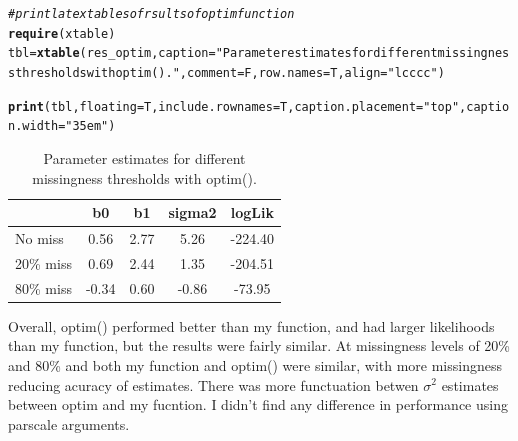 \documentclass{article}\usepackage[]{graphicx}\usepackage[]{color}
\makeatletter
\newcommand{\hlstr}[1]{\textcolor[rgb]{0.192,0.494,0.8}{#1}}%
\newcommand{\hlcom}[1]{\textcolor[rgb]{0.678,0.584,0.686}{\textit{#1}}}%
\newcommand{\hlstd}[1]{\textcolor[rgb]{0.345,0.345,0.345}{#1}}%
\newcommand{\hlkwb}[1]{\textcolor[rgb]{0.69,0.353,0.396}{#1}}%
\newcommand{\hlkwc}[1]{\textcolor[rgb]{0.333,0.667,0.333}{#1}}%
\newcommand{\hlkwd}[1]{\textcolor[rgb]{0.737,0.353,0.396}{\textbf{#1}}}%
\newenvironment{kframe}{%
 \def\at@end@of@kframe{}%
 \ifinner\ifhmode%
  \def\at@end@of@kframe{\end{minipage}}%
  \begin{minipage}{\columnwidth}%
 \fi\fi%
 \def\FrameCommand##1{\hskip\@totalleftmargin \hskip-\fboxsep
 \colorbox{shadecolor}{##1}\hskip-\fboxsep
     \hskip-\linewidth \hskip-\@totalleftmargin \hskip\columnwidth}%
 \MakeFramed {\advance\hsize-\width
   \@totalleftmargin\z@ \linewidth\hsize
   \@setminipage}}%
 {\par\unskip\endMakeFramed%
 \at@end@of@kframe}
\makeatother
\begin{document}
\begin{kframe}
\begin{alltt}
\hlcom{#print latex tables of rsults of optim function}
\hlkwd{require}\hlstd{(xtable)}
\hlstd{tbl}\hlkwb{=}\hlkwd{xtable}\hlstd{(res_optim,}\hlkwc{caption}\hlstd{=}\hlstr{"Parameter estimates for different missingness thresholds with optim()."}\hlstd{,}\hlkwc{comment}\hlstd{=F,}\hlkwc{row.names}\hlstd{=T,}\hlkwc{align}\hlstd{=}\hlstr{"lcccc"}\hlstd{)}

\hlkwd{print}\hlstd{(tbl,}\hlkwc{floating}\hlstd{=T,}\hlkwc{include.rownames}\hlstd{=T,}\hlkwc{caption.placement}\hlstd{=}\hlstr{"top"}\hlstd{,}\hlkwc{caption.width}\hlstd{=}\hlstr{"35em"}\hlstd{)}
\end{alltt}
\end{kframe}%
\begin{table}[ht]
\centering
\parbox{35em}{\caption{Parameter estimates for different missingness thresholds with optim().}} 
\begin{tabular}{lcccc}
  \hline
 & b0 & b1 & sigma2 & logLik \\ 
  \hline
No miss & 0.56 & 2.77 & 5.26 & -224.40 \\ 
  20\% miss & 0.69 & 2.44 & 1.35 & -204.51 \\ 
  80\% miss & -0.34 & 0.60 & -0.86 & -73.95 \\ 
   \hline
\end{tabular}
\end{table}



Overall, optim() performed better than my function, and had larger likelihoods than my function, but the results were fairly similar.  At missingness levels of 20\% and 80\% and both my function and optim() were similar, with more missingness reducing acuracy of estimates. There was more functuation betwen $\sigma^2$ estimates between optim and my fucntion. I didn't find any difference in performance using parscale arguments. 
\end{document}
